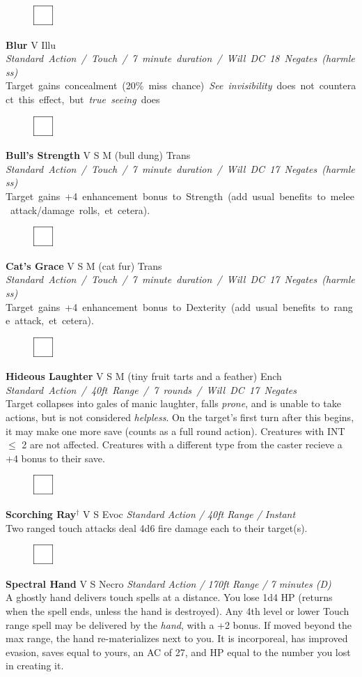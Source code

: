 \documentclass[letterpaper]{article}
\newcommand{\e}[1]{\emph{#1}}
\newcommand{\B}[1]{\textbf{#1}}
\newcommand{\D}[0]{$^\dag$}
\newcommand{\spell}[7]{
\begin{figure}
\vspace{-13pt}
\ifstrequal{#2}{Full}{  \includegraphics[width=2em]{Checkbox-Full}}{
\ifstrequal{#2}{Scroll}{\includegraphics[width=2em]{Checkbox-S}}{
                        \includegraphics[width=2em]{Checkbox}}}
\ifstrequal{#7}{}{\vspace{-1em}}{\vspace{#7}}
\end{figure}
 \B{#1} #3 {
    \ifstrequal{#4}{Conj}{\color{Plum}Conj}{%
    \ifstrequal{#4}{Divin}{\color{YellowOrange}Divin}{%
    \ifstrequal{#4}{Ench}{\color{VioletRed}Ench}{%
    \ifstrequal{#4}{Trans}{\color{LimeGreen}Trans}{%
    \ifstrequal{#4}{Evoc}{\color{RedOrange}Evoc}{%
    \ifstrequal{#4}{Illu}{\color{ProcessBlue}Illu}{%
    \ifstrequal{#4}{Abjur}{\color{CadetBlue}Abjur}{%
    \ifstrequal{#4}{Necro}{\color{Red}Necro}{%
}}}}}}}}}
{\footnotesize \e{#5}} \\
#6
}
\begin{document}
\spell{Blur}{}{V}{Illu}{\mbox{Standard Action / Touch / 7 minute duration / Will DC 18 Negates (harmless)}}{%
\mbox{Target gains concealment (20\% miss chance) \e{See invisibility} does not counteract this effect, but \e{true seeing} does} }{}\\[-1em] %

\spell{Bull's Strength}{}{V S M (bull dung)}{Trans}{\mbox{Standard Action / Touch / 7 minute duration / Will DC 17 Negates (harmless)}}{%
\mbox{Target gains +4 enhancement bonus to Strength (add usual benefits to melee attack/damage rolls, et cetera).} }{}\\[-1em] %

\spell{Cat's Grace}{}{V S M (cat fur)}{Trans}{\mbox{Standard Action / Touch / 7 minute duration / Will DC 17 Negates (harmless)}}{%
\mbox{Target gains +4 enhancement bonus to Dexterity (add usual benefits to range attack, et cetera).} }{}\\[-1em] %

\spell{Hideous Laughter}{}{V S M (tiny fruit tarts and a feather)}{Ench}{\mbox{Standard Action / 40ft Range / 7 rounds / Will DC 17 Negates }}{%
Target collapses into gales of manic laughter, falls \e{prone}, and is unable to take actions, but is not considered \e{helpless}. On the target's first turn after this begins, it may make one more save (counts as a full round action).  Creatures with INT $\leq$ 2 are not affected.  Creatures with a different type from the caster recieve a +4 bonus to their save.}{0em} %

\spell{Scorching Ray\D}{}{V S}{Evoc}{Standard Action / 40ft Range / Instant}{%
Two ranged touch attacks deal 4d6 fire damage each to their target(s).}{}\\[-1em] %

\spell{Spectral Hand}{}{V S}{Necro}{\e{Standard Action / 170ft Range / 7 minutes (D)}}{%
A ghostly hand delivers touch spells at a distance.  You lose 1d4 HP (returns when the spell ends, unless the hand is destroyed). Any 4th level or lower Touch range spell may be delivered by the \e{hand}, with a +2 bonus. If moved beyond the max range, the hand re-materializes next to you. It is incorporeal, has improved evasion, saves equal to yours, an AC of 27, and HP equal to the number you lost in creating it.}{1em}\\[-1em] %
\end{document}

